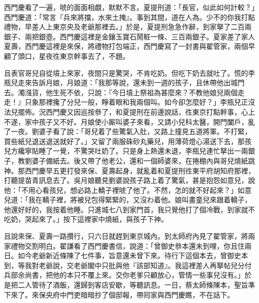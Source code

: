 西門慶看了一遍，唬的面面相覷，默默不言。夏提刑道：「長官，似此如何計較？」西門慶道：「常言『兵來將擋，水來土掩』。事到其間，道在人為。少不的你我打點禮物，早差人上東京央及老爺那裡去。」於是，夏提刑急急作辭，到家拏了二百兩銀子、兩把銀壺。西門慶這裡是金鑲玉寶石鬧粧一條、三百兩銀子。夏家差了家人夏壽，西門慶這裡是來保，將禮物打包端正，西門慶寫了一封書與翟管家，兩個早顧了頭口，星夜徃東京幹事去了，不題。

且表官哥兒自從墳上來家，夜間只是驚哭，不肯吃奶。但吃下奶去就吐了。慌的李瓶兒走來告訴月娘，月娘道：「我那等說，還未到一週的孩子，且休帶他出城門去。濁漒貨，他生死不依，只說：『今日墳上祭祖為甚麼來？不教他娘兒兩個走走！』只象那裡攙了分兒一般，睜着眼和我兩個叫。如今卻怎麼好？」{}李瓶兒正沒法兒擺佈。況西門慶又因巡按叅了，和夏提刑在前邊說話，徃東京打點幹事，心上不遂，家中孩子又不好。月娘使小厮叫婆子來看，又請小兒科太醫，開門闔戶，亂了一夜。劉婆子看了說：「哥兒着了些驚氣入肚，又路上撞見五道將軍。不打緊，買些紙兒退送退送就好了。」又留了兩服硃砂丸藥兒，用薄荷燈心湯送下去，那孩兒方纔寧貼睡了一覺，不驚哭吐奶了。只是身上熱還未退，李瓶兒連忙拏出一兩銀子，教劉婆子備紙去。後又帶了他老公，還和一個師婆來，在捲棚內與哥兒燒紙跳神。那西門慶早五更打發來保、夏壽起身，就亂着和夏提刑徃東平府胡知府那裡，打聽提苗青訊息去了。吳月娘聽見劉婆說孩子路上着了驚氣，甚是抱怨如意兒，{}說他：「不用心看孩兒，想必路上轎子裡唬了他了。不然，怎的就不好起來？」如意兒道：「我在轎子裡，將被兒包得緊緊的，又沒わ着他。娘叫畫童兒來跟着轎子，他還好好的，我按着他睡。只進城七八到家門首，我只覺他打了個冷戰，到家就不吃奶，哭起來了。」{}按下這裡家中燒紙，與孩子下神。

且說來保、夏壽一路攢行，只六日就趕到東京城內。到太師府內見了翟管家，將兩家禮物交割明白。翟謙看了西門慶書信，說道：「曾御史叅本還未到哩，{}你且住兩日。如今老爺新近條陳了七件事，旨意還未曾下來。待行下這個本去，曾御史本到，等我對老爺說，交老爺閣中只批與他『該部知道』。我這裡差人再拏帖兒分付兵部余尚書，把他的本只不覆上來。交你老爹只顧放心，管情一些事兒沒有。」於是把二人管待了酒飯，還歸到客店安歇，等聽訊息。一日，蔡太師條陳本，聖旨準下來了。來保央府中門吏暗暗抄了個邸報，帶囘家與西門慶瞧，不在話下。

